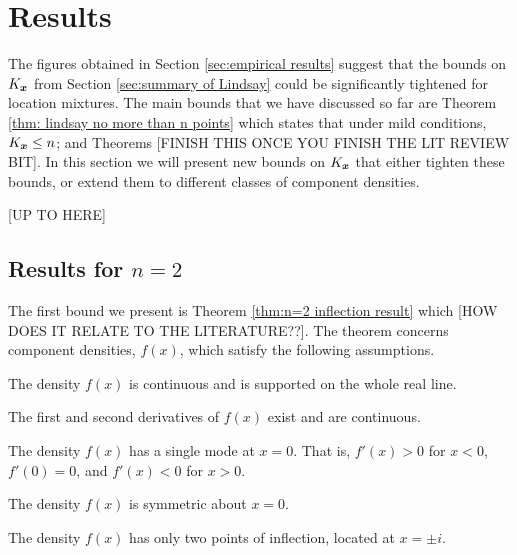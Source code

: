 	\section{Results}
		\label{sec:mixture results}
		The figures obtained in Section \ref{sec:empirical results} suggest that the bounds on $K_{\bm{{x}}}$ from Section \ref{sec:summary of Lindsay} could be significantly tightened for location mixtures. The main bounds that we have discussed so far are Theorem \ref{thm: lindsay no more than n points} which states that under mild conditions, $K_{\bm{{x}}} \leq n$; and Theorems [FINISH THIS ONCE YOU FINISH THE LIT REVIEW BIT]. In this section we will present new bounds on $K_{\bm{{x}}}$ that either tighten these bounds, or extend them to different classes of component densities.


		[UP TO HERE]


		\subsection{Results for \texorpdfstring{$n = 2$}{n = 2}}
		The first bound we present is Theorem \ref{thm:n=2 inflection result} which [HOW DOES IT RELATE TO THE LITERATURE??]. The theorem concerns component densities, $f(x)$, which satisfy the following assumptions.

		\begin{assumption}[Continuity]
		\label{assump:reallinesupport}
			The density $f(x)$ is continuous and is supported on the whole real line.
		\end{assumption}

		\begin{assumption}[Differentiability]
		\label{assump:twicediff}
			The first and second derivatives of $f(x)$ exist and are continuous.
		\end{assumption}
		
		\begin{assumption}[Unimodality]
			The density $f(x)$ has a single mode at $x=0$. That is, $f'(x) > 0$ for $x <0$, $f'(0) = 0$, and $f'(x) < 0$ for $x>0$.
			\label{assump:singlemode}
		\end{assumption}
		
		\begin{assumption}[Symmetry]
			The density $f(x)$ is symmetric about $x = 0$.
			\label{assump:symmetric}
		\end{assumption}
		
		\begin{assumption}
			The density $f(x)$ has only two points of inflection, located at $x = \pm i$.
			\label{assump:twoinflectionpoints}
		\end{assumption}

